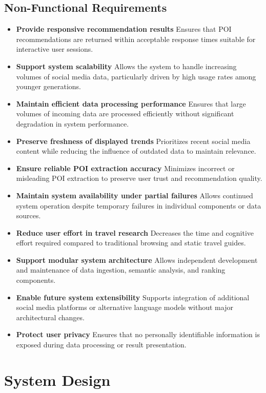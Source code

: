 \documentclass[a4paper,12pt]{report}
\begin{document}
\subsection{Non-Functional Requirements}

\begin{itemize}
\item \textbf{Provide responsive recommendation results}
Ensures that POI recommendations are returned within acceptable response times suitable for interactive user sessions.
\item \textbf{Support system scalability}
Allows the system to handle increasing volumes of social media data, particularly driven by high usage rates among younger generations.
\item \textbf{Maintain efficient data processing performance}
Ensures that large volumes of incoming data are processed efficiently without significant degradation in system performance.
\item \textbf{Preserve freshness of displayed trends}
Prioritizes recent social media content while reducing the influence of outdated data to maintain relevance.
\item \textbf{Ensure reliable POI extraction accuracy}
Minimizes incorrect or misleading POI extraction to preserve user trust and recommendation quality.
\item \textbf{Maintain system availability under partial failures}
Allows continued system operation despite temporary failures in individual components or data sources.
\item \textbf{Reduce user effort in travel research}
Decreases the time and cognitive effort required compared to traditional browsing and static travel guides.
\item \textbf{Support modular system architecture}
Allows independent development and maintenance of data ingestion, semantic analysis, and ranking components.
\item \textbf{Enable future system extensibility}
Supports integration of additional social media platforms or alternative language models without major architectural changes.
\item \textbf{Protect user privacy}
Ensures that no personally identifiable information is exposed during data processing or result presentation.
\end{itemize}

\section{System Design}
\end{document}
